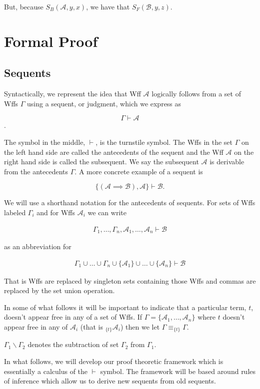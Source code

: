 \documentclass[12pt]{article}
\theoremstyle{break}
\theoremstyle{break}
\theoremstyle{break}
\theoremstyle{break}
\newcommand{\mc}[1]{\mathcal{#1}}
\begin{document}
But, because $S_B(\mc{A}, y, x)$, we have that $S_F(\mc{B}, y, z)$.


\newpage

\section{Formal Proof}
\subsection{Sequents}
Syntactically, we represent the idea that Wff $\mc{A}$ logically follows from a set of Wffs $\Gamma$ using a sequent, or judgment, which we express as

$$\Gamma \vdash \mc{A}$$.

The symbol in the middle, $\vdash$, is the turnstile symbol.
The Wffs in the set $\Gamma$ on the left hand side are called the antecedents of the sequent and the Wff $\mc{A}$ on the right hand side is called the subsequent.
We say the subsequent $\mc{A}$ is derivable from the antecedents $\Gamma$.
A more concrete example of a sequent is 

$$
\{(\mc{A}\implies \mc{B}), \mc{A}\} \vdash \mc{B}.
$$

We will use a shorthand notation for the antecedents of sequents.
For sets of Wffs labeled $\Gamma_i$ and for Wffs $\mc{A}_i$ we can write

\begin{align}
\Gamma_1, \ldots, \Gamma_n, \mc{A}_1, \ldots, \mc{A}_n \vdash \mc{B}
\end{align}

as an abbreviation for

\begin{align}
\Gamma_1 \cup \ldots \cup \Gamma_n \cup \{\mc{A}_1\} \cup \ldots \cup \{\mc{A}_n\} \vdash \mc{B}
\end{align}

That is Wffs are replaced by singleton sets containing those Wffs and commas are replaced by the set union operation.

In some of what follows it will be important to indicate that a particular term, $t$, doesn't appear free in any of a set of Wffs. If $\Gamma = \{\mc{A}_1, \ldots , \mc{A}_n\}$ where $t$ doesn't appear free in any of $\mc{A}_i$ (that is $_{\{t\}}\mc{A}_i$) then we let $\Gamma \equiv _{\{t\}}\Gamma$.

$\Gamma_1 \backslash \Gamma_2$ denotes the subtraction of set $\Gamma_2$ from $\Gamma_1$.

In what follows, we will develop our proof theoretic framework which is essentially a calculus of the $\vdash$ symbol.
The framework will be based around rules of inference which allow us to derive new sequents from old sequents.
\end{document}
